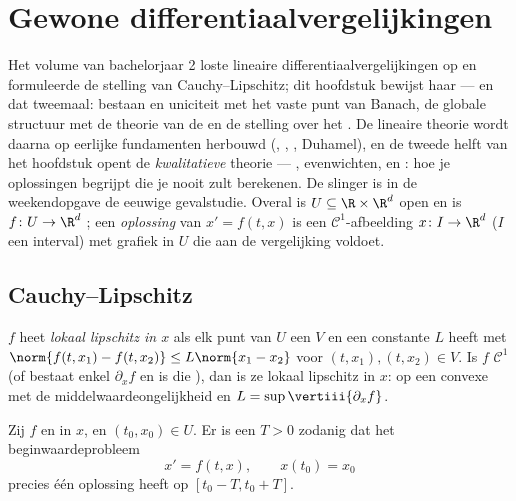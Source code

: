\chapter{Gewone differentiaalvergelijkingen}\label{ch:b3:ode}

Het volume van bachelorjaar 2 loste lineaire
differentiaalvergelijkingen op en formuleerde de stelling van
Cauchy--Lipschitz; dit hoofdstuk bewijst haar --- en dat
tweemaal: bestaan en uniciteit met het vaste punt van Banach, de
globale structuur met de theorie van de  en
de stelling over het . De
lineaire theorie wordt daarna op eerlijke fundamenten herbouwd
(, , , Duhamel), en de
tweede helft van het hoofdstuk opent de \emph{kwalitatieve}
theorie --- , evenwichten,  en
: hoe je oplossingen begrijpt die je
nooit zult berekenen. De slinger is in de weekendopgave de
eeuwige gevalstudie. Overal is $U \subseteq \R\times\R^d$ open en
is $f \colon U \to \R^d$ ; een \emph{oplossing} van $x' =
f(t, x)$ is een $\mathcal C^1$-afbeelding $x \colon I \to \R^d$
($I$ een interval) met grafiek in $U$ die aan de vergelijking
voldoet.

\section{Cauchy--Lipschitz}

\begin{definition}\label{def:b3:ode:lipschitz}
$f$ heet \emph{lokaal lipschitz in $x$}
als elk punt van $U$ een  $V$ en een constante $L$ heeft
met $\norm{f(t, x_1) - f(t, x_2)} \leq L\norm{x_1 - x_2}$ voor
$(t, x_1), (t, x_2) \in V$. Is $f$ $\mathcal C^1$ (of bestaat
enkel $\partial_xf$ en is die ), dan is ze lokaal
lipschitz in $x$: op een  convexe  met de
middelwaardeongelijkheid en $L = \sup\vertiii{\partial_xf}$.
\end{definition}

\begin{theorem}
\label{thm:b3:ode:cauchylipschitz}
Zij $f$  en  in $x$, en $(t_0, x_0) \in
U$. Er is een $T > 0$ zodanig dat het beginwaardeprobleem
\[
x' = f(t, x), \qquad x(t_0) = x_0
\]
precies één oplossing heeft op $[t_0 - T, t_0 +
T]$.
\end{theorem}

